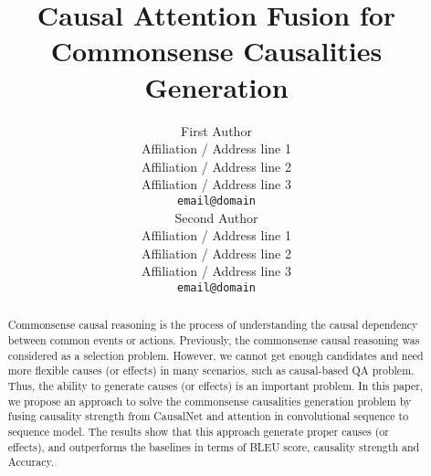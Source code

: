 \documentclass[11pt,a4paper]{article}
\title{Causal Attention Fusion for Commonsense Causalities Generation}
\theoremstyle{definition}
\begin{document}
	
\author{First Author \\
	Affiliation / Address line 1 \\
	Affiliation / Address line 2 \\
	Affiliation / Address line 3 \\
	{\tt email@domain} \\\And
	Second Author \\
	Affiliation / Address line 1 \\
	Affiliation / Address line 2 \\
	Affiliation / Address line 3 \\
	{\tt email@domain} \\}
	
\maketitle

\begin{abstract}
Commonsense causal reasoning is the process of understanding
the causal dependency between 
common events or actions. 
Previously, the commonsense causal reasoning
was considered as a selection problem.
However, we cannot get enough candidates
and need more flexible causes (or effects) in many scenarios,
such as causal-based QA problem.
Thus, the ability to generate causes (or effects) is an important problem. 
In this paper, we propose an approach 
to solve the commonsense causalities generation problem 
by fusing causality strength from CausalNet and attention in convolutional sequence to sequence model.
The results show that this approach generate proper causes (or effects), 
and outperforms the baselines in terms of BLEU score, causality strength and Accuracy.
\end{abstract}









\end{document}
